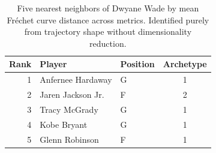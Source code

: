 \begin{table}[htbp]
  \centering\small
  \begin{tabular}{rllc}
    \toprule
    Rank & Player & Position & Archetype \\
    \midrule
    1 & Anfernee Hardaway & G & 1 \\
    2 & Jaren Jackson Jr. & F & 2 \\
    3 & Tracy McGrady & G & 1 \\
    4 & Kobe Bryant & G & 1 \\
    5 & Glenn Robinson & F & 1 \\
    \bottomrule
  \end{tabular}
  \caption{Five nearest neighbors of Dwyane Wade by mean Fr\'{e}chet curve distance across metrics. Identified purely from trajectory shape without dimensionality reduction.}
  \label{tab:Dwyane_Wade_frechet_curve_neighbors}
\end{table}

